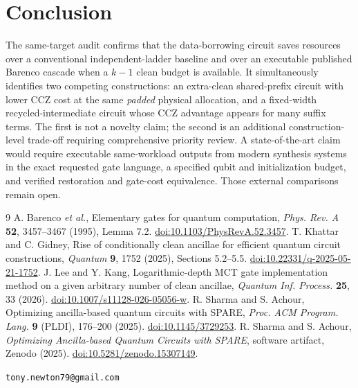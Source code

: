 \documentclass[11pt,a4paper]{article}
\begin{document}
\section{Conclusion}
The same-target audit confirms that the data-borrowing circuit saves resources over a conventional independent-ladder baseline and over an executable published Barenco cascade when a $k-1$ clean budget is available. It simultaneously identifies two competing constructions: an extra-clean shared-prefix circuit with lower CCZ cost at the same \emph{padded} physical allocation, and a fixed-width recycled-intermediate circuit whose CCZ advantage appears for many suffix terms. The first is not a novelty claim; the second is an additional construction-level trade-off requiring comprehensive priority review. A state-of-the-art claim would require executable same-workload outputs from modern synthesis systems in the exact requested gate language, a specified qubit and initialization budget, and verified restoration and gate-cost equivalence. Those external comparisons remain open.

\begin{thebibliography}{9}\small
{} A. Barenco \emph{et al.}, Elementary gates for quantum computation, \emph{Phys. Rev. A} \textbf{52}, 3457--3467 (1995), Lemma 7.2. \href{https://doi.org/10.1103/PhysRevA.52.3457}{doi:10.1103/PhysRevA.52.3457}.
 T. Khattar and C. Gidney, Rise of conditionally clean ancillae for efficient quantum circuit constructions, \emph{Quantum} \textbf{9}, 1752 (2025), Sections 5.2--5.5. \href{https://doi.org/10.22331/q-2025-05-21-1752}{doi:10.22331/q-2025-05-21-1752}.
 J. Lee and Y. Kang, Logarithmic-depth MCT gate implementation method on a given arbitrary number of clean ancillae, \emph{Quantum Inf. Process.} \textbf{25}, 33 (2026). \href{https://doi.org/10.1007/s11128-026-05056-w}{doi:10.1007/s11128-026-05056-w}.
 R. Sharma and S. Achour, Optimizing ancilla-based quantum circuits with SPARE, \emph{Proc. ACM Program. Lang.} \textbf{9} (PLDI), 176--200 (2025). \href{https://doi.org/10.1145/3729253}{doi:10.1145/3729253}.
 R. Sharma and S. Achour, \emph{Optimizing Ancilla-based Quantum Circuits with SPARE}, software artifact, Zenodo (2025). \href{https://doi.org/10.5281/zenodo.15307149}{doi:10.5281/zenodo.15307149}.
\end{thebibliography}
\medskip\noindent\texttt{tony.newton79@gmail.com}
\end{document}
